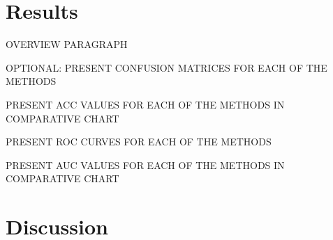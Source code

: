 \documentclass[12pt]{article}
\begin{document}
\section{Results}
\label{sec:resu}

OVERVIEW PARAGRAPH

OPTIONAL: PRESENT CONFUSION MATRICES FOR EACH OF THE METHODS

PRESENT ACC VALUES FOR EACH OF THE METHODS IN COMPARATIVE CHART

PRESENT ROC CURVES FOR EACH OF THE METHODS

PRESENT AUC VALUES FOR EACH OF THE METHODS IN COMPARATIVE CHART

\section{Discussion}
\label{sec:disc}







\end{document}
